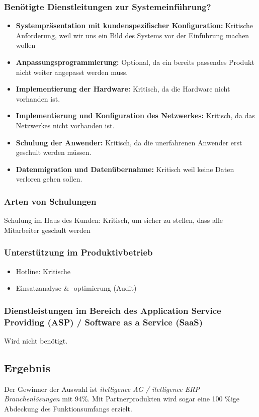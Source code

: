 \subsubsection{Benötigte Dienstleitungen zur Systemeinführung?}
\begin{itemize}
	\item \textbf{Systempräsentation mit kundenspezifischer Konfiguration:} Kritische Anforderung, weil wir uns ein Bild des Systems vor der Einführung machen wollen
	\item \textbf{Anpassungsprogrammierung:} Optional, da ein bereits passendes Produkt nicht weiter angepasst werden muss.
	\item \textbf{Implementierung der Hardware:} Kritisch, da die Hardware nicht vorhanden ist.
	\item \textbf{Implementierung und Konfiguration des Netzwerkes:} Kritisch, da das Netzwerkes nicht vorhanden ist.
	\item \textbf{Schulung der Anwender:} Kritisch, da die unerfahrenen Anwender erst geschult werden müssen.
	\item \textbf{Datenmigration und Datenübernahme:} Kritisch weil keine Daten verloren gehen sollen.
\end{itemize}
\subsubsection{Arten von Schulungen}
Schulung im Haus des Kunden: Kritisch, um sicher zu stellen, dass alle Mitarbeiter geschult werden

\subsubsection{Unterstützung im Produktivbetrieb}
\begin{itemize}
	\item Hotline: Kritische
	\item Einsatzanalyse \& -optimierung (Audit)
\end{itemize}

\subsubsection{Dienstleistungen im Bereich des Application Service Providing (ASP) / Software as a Service (SaaS)}
Wird nicht benötigt.
\newpage
\subsection{Ergebnis}
Der Gewinner der Auswahl ist \textit{itelligence AG / itelligence ERP Branchenlösungen} mit 94\%. Mit Partnerprodukten wird sogar eine 100 \%ige Abdeckung des Funktionsumfangs erzielt. 

